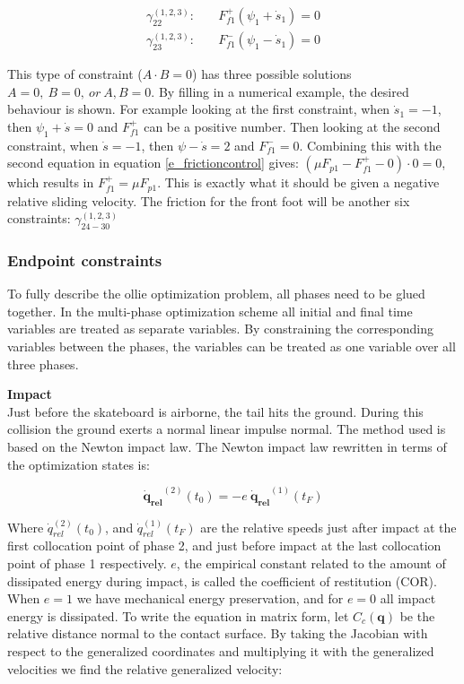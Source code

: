 \documentclass[default,iicol]{sn-jnl}
\theoremstyle{thmstyleone}%
\theoremstyle{thmstyletwo}%
\theoremstyle{thmstylethree}%
\begin{document}
\begin{equation}
\begin{split}
    \gamma_{22}^{(1,2,3)}: \quad & F_{f1}^+ (\psi_1 + \dot s_1)  = 0 \\
    \gamma_{23}^{(1,2,3)}: \quad & F_{f1}^- (\psi_1 - \dot s_1)  = 0
\end{split}
\end{equation}

This type of constraint ($A\cdot B = 0$) has three possible solutions $A= 0,\
B=0,\ or\ A,B = 0$. By filling in a numerical example, the desired behaviour is
shown. For example looking at the first constraint, when $\dot s_1 = -1$, then
$\psi_1 + \dot s =  0$ and $F_{f1}^+$ can be a positive number. Then looking at
the second constraint, when $\dot s = -1$, then $\psi - \dot s = 2$ and
$F_{f1}^- = 0$. Combining this with the second equation in equation
\ref{e_frictioncontrol} gives: $(\mu F_{p1} - F_{f1}^+ - 0) \cdot 0 = 0$, which
results in $F_{f1}^+ = \mu F_{p1}$. This is exactly what it should be given a
negative relative sliding velocity. The friction for the front foot will be
another six constraints: $\gamma_{24-30}^{(1,2,3)}$

\subsubsection{Endpoint constraints} \label{p_endpoints}
To fully describe the ollie optimization problem, all phases need to be glued together. In the multi-phase optimization scheme all initial and final time variables are treated as separate variables. By constraining the corresponding variables between the phases, the variables can be treated as one variable over all three phases.

\textbf{Impact}\\
Just before the skateboard is airborne, the tail hits the ground. During this collision the ground exerts a normal linear impulse normal. The method used\cite{vallery_heike_advanced_2018} is based on the Newton impact law. The Newton impact law rewritten in terms of the optimization states is:

\begin{equation}\label{e_newtonimpact}
    \mathbf{\dot q_{rel}}^{(2)}(t_0) = -e\ \mathbf{\dot q_{rel}}^{(1)}(t_F)
\end{equation}

Where $\dot q_{rel}^{(2)}(t_0)$, and $\dot q_{rel}^{(1)}(t_F)$ are the relative speeds just after impact at the first collocation point of phase 2, and just before impact at the last collocation point of phase 1 respectively.  $e$, the empirical constant related to the amount of dissipated energy during impact, is called the coefficient of restitution (COR). When $e=1$ we have mechanical energy preservation, and for $e=0$ all impact energy is dissipated. To write the equation in matrix form, let $C_c(\mathbf{q})$ be the relative distance normal to the contact surface. By taking the Jacobian with respect to the generalized coordinates and multiplying it with the generalized velocities we find the relative generalized velocity:
\end{document}

